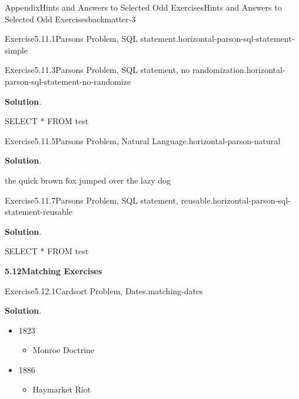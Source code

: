 \documentclass[oneside,10pt,]{book}
\newcommand{\blocktitlefont}{\relax}
\numberwithin{equation}{section}
\begin{document}
\begin{solutions-chapter}{Appendix}{Hints and Answers to Selected Odd Exercises}{}{Hints and Answers to Selected Odd Exercises}{}{}{backmatter-3}
\begin{divisionsolution}{Exercise}{5.11.1}{Parsons Problem, SQL statement.}{horizontal-parson-sql-statement-simple}
%
\end{divisionsolution}%
\begin{divisionsolution}{Exercise}{5.11.3}{Parsons Problem, SQL statement, no randomization.}{horizontal-parson-sql-statement-no-randomize}%
\par\smallskip%
\noindent\textbf{\blocktitlefont Solution}.\hypertarget{horizontal-parson-sql-statement-no-randomize-3-back}{}\quad{}%
\begin{codedisplay}
SELECT * FROM test
\end{codedisplay}
%
\end{divisionsolution}%
\begin{divisionsolution}{Exercise}{5.11.5}{Parsons Problem, Natural Language.}{horizontal-parson-natural}%
\par\smallskip%
\noindent\textbf{\blocktitlefont Solution}.\hypertarget{horizontal-parson-natural-3-back}{}\quad{}%
\begin{codedisplay}
the quick brown fox jumped over the lazy dog
\end{codedisplay}
%
\end{divisionsolution}%
\begin{divisionsolution}{Exercise}{5.11.7}{Parsons Problem, SQL statement, reusable.}{horizontal-parson-sql-statement-reusable}%
\par\smallskip%
\noindent\textbf{\blocktitlefont Solution}.\hypertarget{horizontal-parson-sql-statement-reusable-3-back}{}\quad{}%
\begin{codedisplay}
SELECT * FROM test
\end{codedisplay}
%
\end{divisionsolution}%
\par\medskip
\noindent\textbf{\Large{}5.12\space\textperiodcentered\space{}Matching Exercises}
\begin{divisionsolution}{Exercise}{5.12.1}{Cardsort Problem, Dates.}{matching-dates}%
\par\smallskip%
\noindent\textbf{\blocktitlefont Solution}.\hypertarget{matching-dates-4-back}{}\quad{}%
\begin{itemize}[label=\textbullet]
\item{}1823%
\begin{itemize}[label=$\circ$]
\item{}Monroe Doctrine%
\end{itemize}
%
\item{}1886%
\begin{itemize}[label=$\circ$]
\item{}Haymarket Riot%

\end{itemize}
\end{itemize}
\end{divisionsolution}
\end{solutions-chapter}
\end{document}
